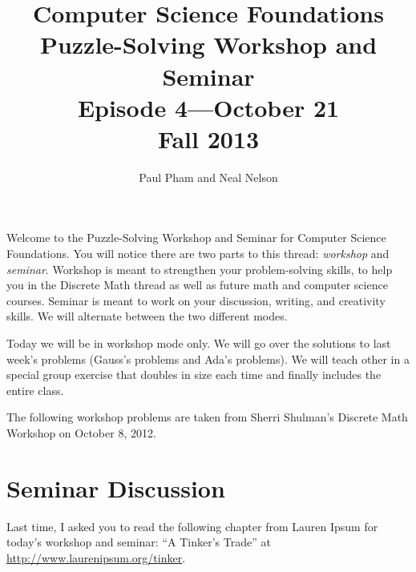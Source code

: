 \documentclass{article}
\title{Computer Science Foundations\\ Puzzle-Solving Workshop and Seminar\\
\large{Episode 4---October 21}\\
Fall 2013}
\author{Paul Pham and Neal Nelson}
\begin{document}
\maketitle

Welcome to the Puzzle-Solving Workshop and Seminar for
Computer Science Foundations. You will notice there are
two parts to this thread: \emph{workshop} and \emph{seminar}.
Workshop is meant to strengthen your problem-solving skills,
to help you in the Discrete Math thread as well as future
math and computer science courses. Seminar is meant to
work on your discussion, writing, and creativity skills.
We will alternate between the two different modes.

Today we will be in workshop mode only. We will go over the
solutions to last week's problems (Gauss's problems and
Ada's problems). We will teach other in a special
group exercise that doubles in size each time and
finally includes the entire class.

The following workshop problems are taken from
Sherri Shulman's Discrete Math Workshop on October 8, 2012.


\section{Seminar Discussion}

Last time, I asked you to read
the following chapter from Lauren Ipsum for today's workshop and seminar:
``A Tinker's Trade'' at \url{http://www.laurenipsum.org/tinker}.
\end{document}
